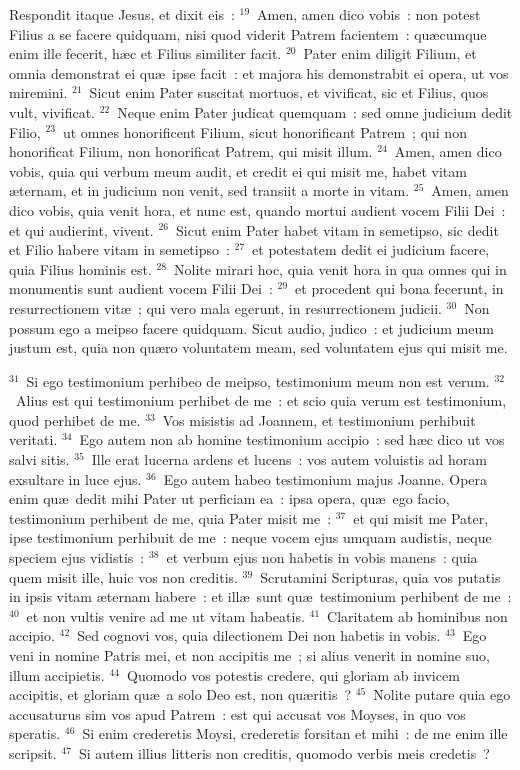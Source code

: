  Respondit itaque Jesus, et dixit eis~:
${}^{19}$~Amen, amen dico vobis~: non potest Filius a se facere quidquam, nisi quod viderit Patrem facientem~: qu\ae cumque enim ille fecerit, h\ae c et Filius similiter facit.
${}^{20}$~Pater enim diligit Filium, et omnia demonstrat ei qu\ae\ ipse facit~: et majora his demonstrabit ei opera, ut vos miremini.
${}^{21}$~Sicut enim Pater suscitat mortuos, et vivificat, sic et Filius, quos vult, vivificat.
${}^{22}$~Neque enim Pater judicat quemquam~: sed omne judicium dedit Filio,
${}^{23}$~ut omnes honorificent Filium, sicut honorificant Patrem~; qui non honorificat Filium, non honorificat Patrem, qui misit illum.
${}^{24}$~Amen, amen dico vobis, quia qui verbum meum audit, et credit ei qui misit me, habet vitam \ae ternam, et in judicium non venit, sed transiit a morte in vitam.
${}^{25}$~Amen, amen dico vobis, quia venit hora, et nunc est, quando mortui audient vocem Filii Dei~: et qui audierint, vivent.
${}^{26}$~Sicut enim Pater habet vitam in semetipso, sic dedit et Filio habere vitam in semetipso~:
${}^{27}$~et potestatem dedit ei judicium facere, quia Filius hominis est.
${}^{28}$~Nolite mirari hoc, quia venit hora in qua omnes qui in monumentis sunt audient vocem Filii Dei~:
${}^{29}$~et procedent qui bona fecerunt, in resurrectionem vit\ae~; qui vero mala egerunt, in resurrectionem judicii.
${}^{30}$~Non possum ego a meipso facere quidquam. Sicut audio, judico~: et judicium meum justum est, quia non qu\ae ro voluntatem meam, sed voluntatem ejus qui misit me.


${}^{31}$~Si ego testimonium perhibeo de meipso, testimonium meum non est verum.
${}^{32}$~Alius est qui testimonium perhibet de me~: et scio quia verum est testimonium, quod perhibet de me.
${}^{33}$~Vos misistis ad Joannem, et testimonium perhibuit veritati.
${}^{34}$~Ego autem non ab homine testimonium accipio~: sed h\ae c dico ut vos salvi sitis.
${}^{35}$~Ille erat lucerna ardens et lucens~: vos autem voluistis ad horam exsultare in luce ejus.
${}^{36}$~Ego autem habeo testimonium majus Joanne. Opera enim qu\ae\ dedit mihi Pater ut perficiam ea~: ipsa opera, qu\ae\ ego facio, testimonium perhibent de me, quia Pater misit me~:
${}^{37}$~et qui misit me Pater, ipse testimonium perhibuit de me~: neque vocem ejus umquam audistis, neque speciem ejus vidistis~:
${}^{38}$~et verbum ejus non habetis in vobis manens~: quia quem misit ille, huic vos non creditis.
${}^{39}$~Scrutamini Scripturas, quia vos putatis in ipsis vitam \ae ternam habere~: et ill\ae\ sunt qu\ae\ testimonium perhibent de me~:
${}^{40}$~et non vultis venire ad me ut vitam habeatis.
${}^{41}$~Claritatem ab hominibus non accipio.
${}^{42}$~Sed cognovi vos, quia dilectionem Dei non habetis in vobis.
${}^{43}$~Ego veni in nomine Patris mei, et non accipitis me~; si alius venerit in nomine suo, illum accipietis.
${}^{44}$~Quomodo vos potestis credere, qui gloriam ab invicem accipitis, et gloriam qu\ae\ a solo Deo est, non qu\ae ritis~?
${}^{45}$~Nolite putare quia ego accusaturus sim vos apud Patrem~: est qui accusat vos Moyses, in quo vos speratis.
${}^{46}$~Si enim crederetis Moysi, crederetis forsitan et mihi~: de me enim ille scripsit.
${}^{47}$~Si autem illius litteris non creditis, quomodo verbis meis credetis~?

